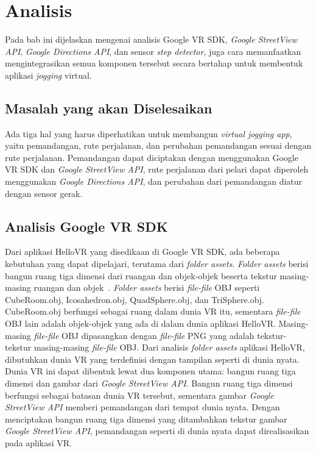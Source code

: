 \chapter{Analisis}
\label{chap:analisis}
Pada bab ini dijelaskan mengenai analisis Google VR SDK, \textit{Google StreetView API}, \textit{Google Directions API}, dan  sensor \textit{step detector}, juga cara memanfaatkan   mengintegrasikan semua komponen tersebut secara bertahap untuk membentuk aplikasi \textit{jogging} virtual. 

\section{Masalah yang akan Diselesaikan}
Ada tiga hal yang harus diperhatikan untuk membangun \textit{virtual jogging app}, yaitu pemandangan, rute perjalanan, dan perubahan pemandangan sesuai dengan rute perjalanan. Pemandangan dapat diciptakan dengan menggunakan Google VR SDK dan \textit{Google StreetView API}, rute perjalanan dari pelari dapat diperoleh menggunakan \textit{Google Directions API}, dan perubahan dari pemandangan diatur dengan sensor gerak. 

\section{Analisis Google VR SDK}
Dari aplikasi HelloVR yang disedikaan di Google VR SDK, ada beberapa kebutuhan yang dapat dipelajari, terutama dari \textit{folder assets}. \textit{Folder assets} berisi bangun ruang tiga dimensi dari ruangan dan objek-objek beserta tekstur masing-masing ruangan dan objek~\cite{quickstart-google-vr}. \textit{Folder assets} berisi \textit{file-file} OBJ seperti CubeRoom.obj, Icosahedron.obj, QuadSphere.obj, dan TriSphere.obj. CubeRoom.obj berfungsi sebagai ruang dalam dunia VR itu, sementara \textit{file-file} OBJ lain adalah objek-objek yang ada di dalam dunia aplikasi HelloVR. Masing-masing \textit{file-file} OBJ dipasangkan dengan \textit{file-file} PNG yang adalah tekstur-tekstur masing-masing \textit{file-file} OBJ. Dari analisis \textit{folder assets} aplikasi HelloVR, dibutuhkan dunia VR yang terdefinisi dengan tampilan seperti di dunia nyata. Dunia VR ini dapat dibentuk lewat dua komponen utama: bangun ruang tiga dimensi dan gambar dari \textit{Google StreetView API}. Bangun ruang tiga dimensi berfungsi sebagai batasan dunia VR tersebut, sementara gambar \textit{Google StreetView API} memberi pemandangan dari tempat dunia nyata. Dengan menciptakan bangun ruang tiga dimensi yang ditambahkan tekstur gambar \textit{Google StreetView API}, pemandangan seperti di dunia nyata dapat direalisasikan pada aplikasi VR. 

